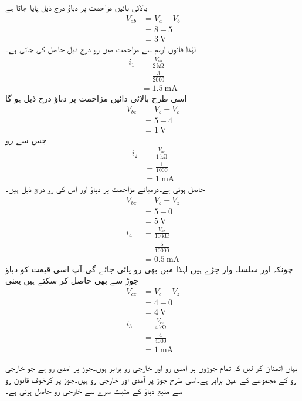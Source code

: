 بالائی بائیں مزاحمت پر دباؤ درج ذیل پایا جاتا ہے
\begin{align*}
V_{ab}&=V_a-V_b\\
&=8-5\\
&=\SI{3}{\volt}
\end{align*}
لہٰذا قانون اوہم سے مزاحمت میں رو درج ذیل حاصل کی جاتی ہے۔
\begin{align*}
i_1&=\frac{V_{ab}}{\SI{2}{\kilo\ohm}}\\
&=\frac{3}{2000}\\
&=\SI{1.5}{\milli\ampere}
\end{align*}
اسی طرح بالائی دائیں مزاحمت پر دباؤ  درج ذیل ہو گا
\begin{align*}
V_{bc}&=V_b-V_c\\
&=5-4\\
&=\SI{1}{\volt}
\end{align*}
جس سے رو
\begin{align*}
i_2&=\frac{V_{bc}}{\SI{1}{\kilo\ohm}}\\
&=\frac{1}{1000}\\
&=\SI{1}{\milli\ampere}
\end{align*}
حاصل ہوتی ہے۔درمیانے مزاحمت پر دباؤ اور اس کی رو درج ذیل ہیں۔
\begin{align*}
V_{bz}&=V_b-V_z\\
&=5-0\\
&={\SI{5}{\volt}}\\
i_4&=\frac{V_{bz}}{\SI{10}{\kilo\ohm}}\\
&=\frac{5}{10000}\\
&=\SI{0.5}{\milli\ampere}
\end{align*}
چونکہ  اور  سلسلہ وار جڑے ہیں لہٰذا  میں بھی  رو پائی جائے گی۔آپ اسی قیمت کو دباؤ جوڑ سے بھی حاصل کر سکتے ہیں یعنی
\begin{align*}
V_{cz}&=V_c-V_z\\
&=4-0\\
&=\SI{4}{\volt}\\
i_3&=\frac{V_{cz}}{\SI{4}{\kilo\ohm}}\\
&=\frac{4}{4000}\\
&=\SI{1}{\milli\ampere}
\end{align*}

یہاں اتمنان کر لیں کہ تمام جوڑوں پر آمدی رو اور خارجی رو برابر ہوں۔جوڑ  پر آمدی رو  ہے جو خارجی رو کے مجموعے  کے عین برابر ہے۔اسی طرح جوڑ  پر آمدی اور خارجی رو  ہیں۔جوڑ  پر کرخوف قانون رو سے منبع دباؤ کے مثبت سرے سے خارجی رو  حاصل ہوتی ہے۔

